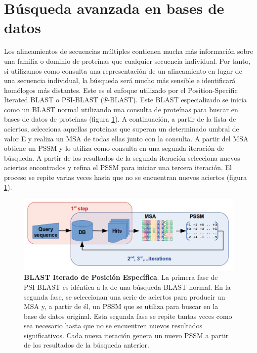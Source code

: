 \section{Búsqueda avanzada en bases de datos}
Los alineamientos de secuencias múltiples contienen mucha más información sobre una familia o dominio de proteínas que cualquier secuencia individual. Por tanto, si utilizamos como consulta una representación de un alineamiento en lugar de una secuencia individual, la búsqueda será mucho más sensible e identificará homólogos más distantes. Este es el enfoque utilizado por el Position-Specific Iterated BLAST o PSI-BLAST ($\Psi$-BLAST). Este BLAST especializado se inicia como un BLAST normal utilizando una consulta de proteínas para buscar en bases de datos de proteínas (figura \ref{fig:adv-blast}). A continuación, a partir de la lista de aciertos, selecciona aquellas proteínas que superan un determinado umbral de valor E y realiza un MSA de todas ellas junto con la consulta. A partir del MSA obtiene un PSSM y lo utiliza como consulta en una segunda iteración de búsqueda. A partir de los resultados de la segunda iteración selecciona nuevos aciertos encontrados y refina el PSSM para iniciar una tercera iteración. El proceso se repite varias veces hasta que no se encuentran nuevos aciertos (figura \ref{fig:adv-blast}).

\begin{figure}[htbp]
\centering
\includegraphics[width = \textwidth]{figs/advanced-blast.png}
\caption{\textbf{BLAST Iterado de Posición Específica}. La primera fase de PSI-BLAST es idéntica a la de una búsqueda BLAST normal. En la segunda fase, se seleccionan una serie de aciertos para producir un MSA y, a partir de él, un PSSM que se utiliza para buscar en la base de datos original. Esta segunda fase se repite tantas veces como sea necesario hasta que no se encuentren nuevos resultados significativos. Cada nueva iteración genera un nuevo PSSM a partir de los resultados de la búsqueda anterior.}
\label{fig:adv-blast}
\end{figure}

